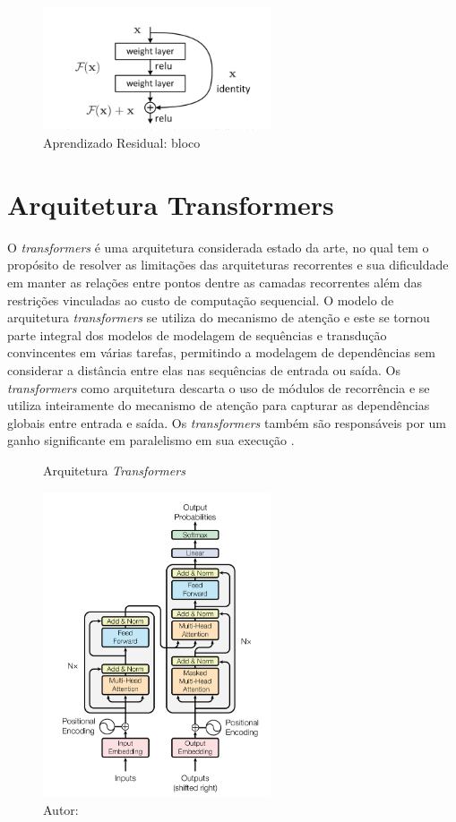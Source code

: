 \begin{figure}[htbp]
    \centering
    \includegraphics[width=0.6\textwidth]{figures/fig003.png}
    \caption{Aprendizado Residual: bloco}
    \label{fig:fig003}
\end{figure}

\section{Arquitetura Transformers}

O \textit{transformers} é uma arquitetura considerada estado da arte, no qual tem o propósito de resolver as limitações das arquiteturas recorrentes e sua dificuldade em manter as relações entre pontos dentre as camadas recorrentes além das restrições vinculadas ao custo de computação sequencial. O modelo de arquitetura \textit{transformers} se utiliza do mecanismo de atenção e este se tornou parte integral dos modelos de modelagem de sequências e transdução convincentes em várias tarefas, permitindo a modelagem de dependências sem considerar a distância entre elas nas sequências de entrada ou saída. Os \textit{transformers} como arquitetura descarta o uso de módulos de recorrência e se utiliza inteiramente do mecanismo de atenção para capturar as dependências globais entre entrada e saída. Os \textit{transformers} também são responsáveis por um ganho significante em paralelismo em sua execução \cite{vaswaniAttentionAllYou2023}.

\begin{figure}[htbp]
    \centering
    \caption{Arquitetura \textit{Transformers}}
    \includegraphics[width=0.6\textwidth]{figures/fig004.png}
    \caption*{Autor: }
    \label{fig:fig004}
\end{figure}


